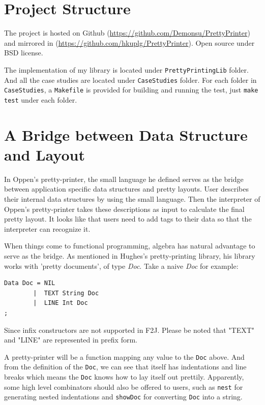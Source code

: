 \section{Project Structure}
The project is hosted on Github (\url{https://github.com/Demonsu/PrettyPrinter}) and mirrored in (\url{https://github.com/hkuplg/PrettyPrinter}). Open source under BSD license.

The implementation of my library is located under \texttt{PrettyPrintingLib} folder. And all the case studies are located under \texttt{CaseStudies} folder. For each folder in \texttt{CaseStudies}, a \texttt{Makefile} is provided for building and running the test, just \texttt{make test} under each folder.



\section{A Bridge between Data Structure and Layout}

In Oppen's pretty-printer\cite{oppen1980prettyprinting}, the small language he defined serves as the bridge between application specific data structures and pretty layouts. User describes their internal data structures by using the small language. Then the interpreter of Oppen's pretty-printer takes these descriptions as input to calculate the final pretty layout. It looks like that users need to add tags to their data so that the interpreter can recognize it.

When things come to functional programming, algebra has natural advantage to serve as the bridge. As mentioned in Hughes's pretty-printing library\cite{hughes1995design}, his library works with 'pretty documents', of type \textit{Doc}. Take a naive \textit{Doc} for example:

\begin{lstlisting}
Data Doc = NIL
        |  TEXT String Doc
        |  LINE Int Doc
;
\end{lstlisting}

\begin{remark}
Since infix constructors are not supported in F2J. Please be noted that "TEXT" and "LINE" are represented in prefix form.
\end{remark}

A pretty-printer will be a function mapping any value to the \texttt{Doc} above. And from the definition of the \texttt{Doc}, we can see that itself has indentations and line breaks which means the \texttt{Doc} knows how to lay itself out prettily. Apparently, some high level combinators should also be offered to users, such as \texttt{nest} for generating nested indentations and \texttt{showDoc} for converting \texttt{Doc} into a string.

